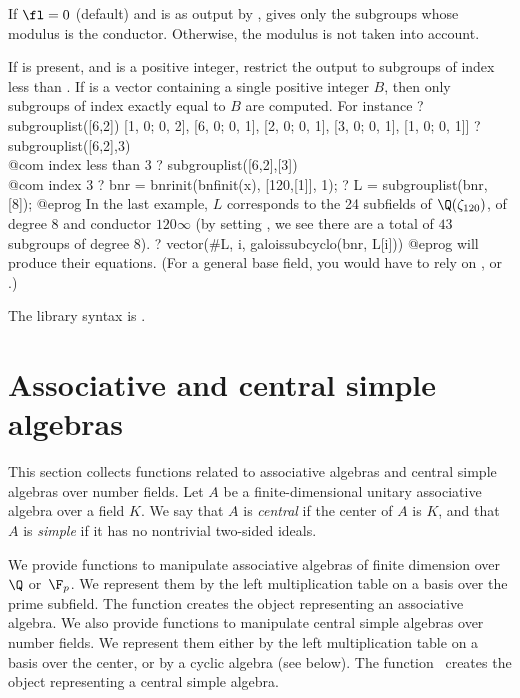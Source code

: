 If $\fl=0$ (default) and  is as output by , gives
only the subgroups whose modulus is the conductor. Otherwise, the modulus is
not taken into account.

If  is present, and is a positive integer, restrict the output to
subgroups of index less than . If  is a vector
containing a single positive integer $B$, then only subgroups of index
exactly equal to $B$ are computed. For instance
\bprog
? subgrouplist([6,2])
[1, 0; 0, 2], [6, 0; 0, 1], [2, 0; 0, 1], [3, 0; 0, 1], [1, 0; 0, 1]]
? subgrouplist([6,2],3)    \\@com index less than 3
? subgrouplist([6,2],[3])  \\@com index 3
? bnr = bnrinit(bnfinit(x), [120,[1]], 1);
? L = subgrouplist(bnr, [8]);
@eprog\noindent
In the last example, $L$ corresponds to the 24 subfields of
$\Q(\zeta_{120})$, of degree $8$ and conductor $120\infty$ (by setting \fl,
we see there are a total of $43$ subgroups of degree $8$).
\bprog
? vector(#L, i, galoissubcyclo(bnr, L[i]))
@eprog\noindent
will produce their equations. (For a general base field, you would
have to rely on , or .)

The library syntax is .

\section{Associative and central simple algebras}

This section collects functions related to associative algebras and central
simple algebras over number fields. Let $A$ be a finite-dimensional unitary
associative algebra over a field $K$. We say that $A$ is \emph{central} if
the center of $A$ is $K$, and that $A$ is \emph{simple} if it has no
nontrivial two-sided ideals.

We provide functions to manipulate associative algebras of finite
dimension over~$\Q$ or~$\F_p$. We represent them by the left multiplication
table on a basis over the prime subfield. The function 
creates the object representing an associative algebra. We also provide
functions to manipulate central simple algebras over number fields. We
represent them either by the left multiplication table on a basis over the
center, or by a cyclic algebra (see below). The function~ creates
the object representing a central simple algebra.

